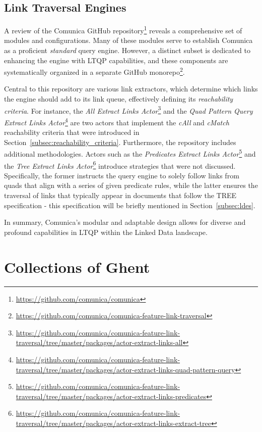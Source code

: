 \subsection{Link Traversal Engines}

A review of the Comunica GitHub repository\footnote{\url{https://github.com/comunica/comunica}} reveals a comprehensive set of modules and configurations. Many of these modules serve to establish Comunica as a proficient \textit{standard} query engine. However, a distinct subset is dedicated to enhancing the engine with LTQP capabilities, and these components are systematically organized in a separate GitHub monorepo\footnote{\url{https://github.com/comunica/comunica-feature-link-traversal}}.

Central to this repository are various link extractors, which determine which links the engine should add to its link queue, effectively defining its \textit{reachability criteria}. For instance, the \textit{All Extract Links Actor}\footnote{\url{https://github.com/comunica/comunica-feature-link-traversal/tree/master/packages/actor-extract-links-all}} and the \textit{Quad Pattern Query Extract Links Actor}\footnote{\url{https://github.com/comunica/comunica-feature-link-traversal/tree/master/packages/actor-extract-links-quad-pattern-query}} are two actors that implement the \textit{cAll} and \textit{cMatch} reachability criteria that were introduced in Section~\ref{subsec:reachability_criteria}. Furthermore, the repository includes additional methodologies. Actors such as the \textit{Predicates Extract Links Actor}\footnote{\url{https://github.com/comunica/comunica-feature-link-traversal/tree/master/packages/actor-extract-links-predicates}} and the \textit{Tree Extract Links Actor}\footnote{\url{https://github.com/comunica/comunica-feature-link-traversal/tree/master/packages/actor-extract-links-extract-tree}} introduce strategies that were not discussed. Specifically, the former instructs the query engine to solely follow links from quads that align with a series of given predicate rules, while the latter ensures the traversal of links that typically appear in documents that follow the TREE specification - this specification will be briefly mentioned in Section~\ref{subsec:ldes}. \citep{taelman2019lt}

In summary, Comunica's modular and adaptable design allows for diverse and profound capabilities in LTQP within the Linked Data landscape.

\section{Collections of Ghent}
\label{sec:coghent}

